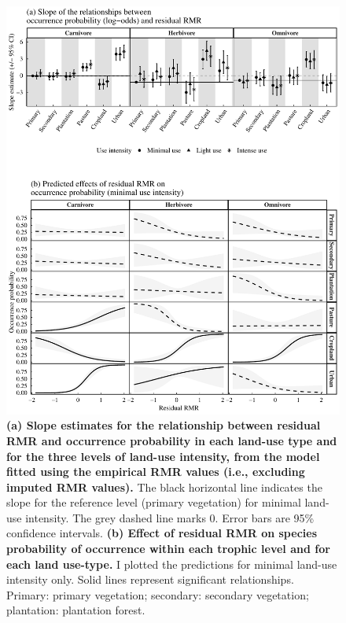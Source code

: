 \newpage
\begin{figure}[h!]
\centering
\includegraphics[scale=0.67]{Supporting/Chapter5/Figures/Figure_predictions_slopes_Complete_data_v2}
\caption[Slope estimates and predictions for the relationship between occurrence probability and residual RMR for the model fitted on empirical RMR values only]{\textbf{(a) Slope estimates for the relationship between residual RMR and occurrence probability in each land-use type and for the three levels of land-use intensity, from the model fitted using the empirical RMR values (i.e., excluding imputed RMR values).} The black horizontal line indicates the slope for the reference level (primary vegetation) for minimal land-use intensity. The grey dashed line marks 0. Error bars are 95\% confidence intervals. \textbf{(b) Effect of residual RMR on species probability of occurrence within each trophic level and for each land use-type.} I plotted the predictions for minimal land-use intensity only. Solid lines represent significant relationships. Primary: primary vegetation; secondary: secondary vegetation; plantation: plantation forest.}
\label{SI5_figure8}
\end{figure}

\clearpage